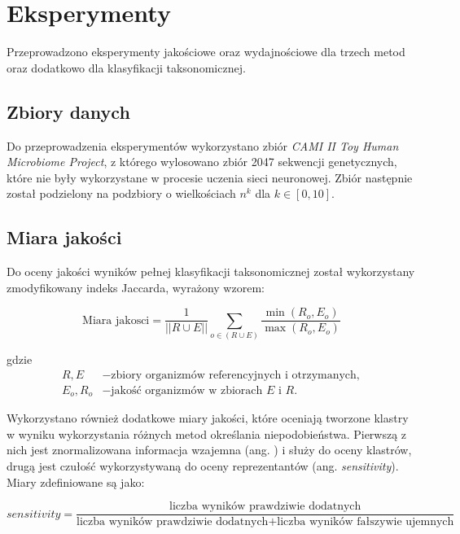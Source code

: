 \clearpage
    \section{Eksperymenty}

        Przeprowadzono eksperymenty jakościowe oraz wydajnościowe dla trzech metod oraz dodatkowo dla klasyfikacji taksonomicznej.

        \subsection{Zbiory danych}
            Do przeprowadzenia eksperymentów wykorzystano zbiór \textit{CAMI II Toy Human Microbiome Project}, z którego wylosowano zbiór 2047 sekwencji genetycznych, które nie były wykorzystane w procesie uczenia sieci neuronowej. Zbiór następnie został podzielony na podzbiory o wielkościach $n^k$ dla $k \in [0, 10]$.

        \subsection{Miara jakości}
            Do oceny jakości wyników pełnej klasyfikacji taksonomicznej został wykorzystany zmodyfikowany indeks Jaccarda, wyrażony wzorem:

            \begin{equation}
                \text{Miara jakosci} = \frac{1}{|| R \cup E||} \sum_{o \in (R \cup E)}{
                    \frac{\min{(R_o, E_o)}}{\max{(R_o, E_o)}}
                }
            \end{equation}
    
            gdzie 
            \begin{align*}
                R, E &- \text{zbiory organizmów referencyjnych i otrzymanych}, \\
                E_o, R_o &- \text{jakość organizmów w zbiorach } E \text{ i } R.
            \end{align*}

            Wykorzystano również dodatkowe miary jakości, które oceniają tworzone klastry w wyniku wykorzystania różnych metod określania niepodobieństwa. Pierwszą z nich jest znormalizowana informacja wzajemna (ang. ) i służy do oceny klastrów, drugą jest czułość wykorzystywaną do oceny reprezentantów (ang. \textit{sensitivity}). Miary zdefiniowane są jako:

            \begin{equation}
                sensitivity = \frac{\text{liczba wyników prawdziwie dodatnych}}{
                    \text{liczba wyników prawdziwie dodatnych} + \text{liczba wyników fałszywie ujemnych}
                }
            \end{equation}
            
